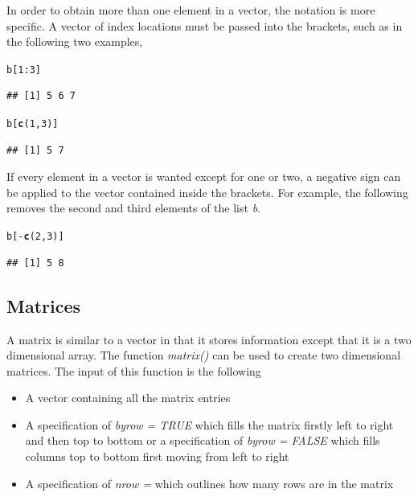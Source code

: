 \documentclass{report}\usepackage[]{graphicx}\usepackage[]{color}
\makeatletter
\newcommand{\hlnum}[1]{\textcolor[rgb]{0.686,0.059,0.569}{#1}}%
\newcommand{\hlopt}[1]{\textcolor[rgb]{0,0,0}{#1}}%
\newcommand{\hlstd}[1]{\textcolor[rgb]{0.345,0.345,0.345}{#1}}%
\newcommand{\hlkwd}[1]{\textcolor[rgb]{0.737,0.353,0.396}{\textbf{#1}}}%
\newenvironment{kframe}{%
 \def\at@end@of@kframe{}%
 \ifinner\ifhmode%
  \def\at@end@of@kframe{\end{minipage}}%
  \begin{minipage}{\columnwidth}%
 \fi\fi%
 \def\FrameCommand##1{\hskip\@totalleftmargin \hskip-\fboxsep
 \colorbox{shadecolor}{##1}\hskip-\fboxsep
     \hskip-\linewidth \hskip-\@totalleftmargin \hskip\columnwidth}%
 \MakeFramed {\advance\hsize-\width
   \@totalleftmargin\z@ \linewidth\hsize
   \@setminipage}}%
 {\par\unskip\endMakeFramed%
 \at@end@of@kframe}
\newenvironment{knitrout}{}{} %
\makeatother
\begin{document}
In order to obtain more than one element in a vector, the notation is more specific.  A vector of index locations must be passed into the brackets, such as in the following two examples, 
\begin{knitrout}
\color{fgcolor}\begin{kframe}
\begin{alltt}
\hlstd{b[}\hlnum{1}\hlopt{:}\hlnum{3}\hlstd{]}
\end{alltt}
\begin{verbatim}
## [1] 5 6 7
\end{verbatim}
\begin{alltt}
\hlstd{b[}\hlkwd{c}\hlstd{(}\hlnum{1}\hlstd{,}\hlnum{3}\hlstd{)]}
\end{alltt}
\begin{verbatim}
## [1] 5 7
\end{verbatim}
\end{kframe}
\end{knitrout}

If every element in a vector is wanted except for one or two, a negative sign can be applied to the vector contained inside the brackets.  For example, the following removes the second and third elements of the list \textit{b}.  
\begin{knitrout}
\color{fgcolor}\begin{kframe}
\begin{alltt}
\hlstd{b[}\hlopt{-}\hlkwd{c}\hlstd{(}\hlnum{2}\hlstd{,}\hlnum{3}\hlstd{)]}
\end{alltt}
\begin{verbatim}
## [1] 5 8
\end{verbatim}
\end{kframe}
\end{knitrout}


\subsection{Matrices} 
A matrix is similar to a vector in that it stores information except that it is a two dimensional array.  The function \textit{matrix()} can be used to create two dimensional matrices.  The input of this function is the following 
\begin{itemize} 
\item A vector containing all the matrix entries
\item A specification of \textit{byrow = TRUE} which fills the matrix firstly left to right and then top to bottom or a specification of \textit{byrow = FALSE} which fills columns top to bottom first moving from left to right 
\item A specification of \textit{nrow = } which outlines how many rows are in the matrix
\end{itemize} 
\end{document}
